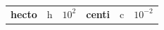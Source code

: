 {{\begin{center}
\begin{xtabular}[t]{|l|l|l|l|l|l|}
    
        
                \textbf{hecto}
               &
    
    
        h &
    
    
        
                \begin{math}{10}^{2}\end{math}
               &
    
    
        
                \textbf{centi}
               &
    
    
        c &
    
    
        
                \begin{math}{10}^{-2}\end{math}
     \tabularnewline{}
    
    
        

\end{xtabular}
\end{center}}}
